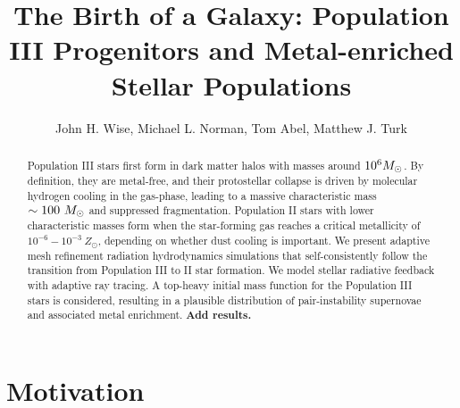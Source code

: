 \documentclass[apjl]{emulateapj}
\begin{document}

\title{The Birth of a Galaxy: Population III Progenitors and
  Metal-enriched Stellar Populations}

\author{John H. Wise, 
  Michael L. Norman,
  Tom Abel,
  Matthew J. Turk}


\begin{abstract}

  Population III stars first form in dark matter halos with masses
  around $10^6 \Ms$.  By definition, they are metal-free, and their
  protostellar collapse is driven by molecular hydrogen cooling in the
  gas-phase, leading to a massive characteristic mass $\sim 100~\Ms$
  and suppressed fragmentation.  Population II stars with lower
  characteristic masses form when the star-forming gas reaches a
  critical metallicity of $10^{-6} - 10^{-3}~Z_\odot$, depending on
  whether dust cooling is important.  We present adaptive mesh
  refinement radiation hydrodynamics simulations that
  self-consistently follow the transition from Population III to II
  star formation.  We model stellar radiative feedback with adaptive
  ray tracing.  A top-heavy initial mass function for the Population
  III stars is considered, resulting in a plausible distribution of
  pair-instability supernovae and associated metal enrichment.
  \textbf{Add results.}

\end{abstract}


\section{Motivation}
\end{document}
